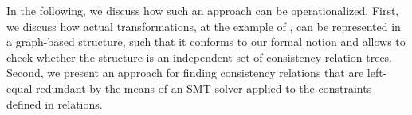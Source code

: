In the following, we discuss how such an approach can be operationalized.
First, we discuss how actual transformations, at the example of \qvtr, can be represented in a graph-based structure, such that it conforms to our formal notion and allows to check whether the structure is an independent set of consistency relation trees.
Second, we present an approach for finding consistency relations that are left-equal redundant by the means of an \gls{SMT} solver applied to the constraints defined in \qvtr relations.


